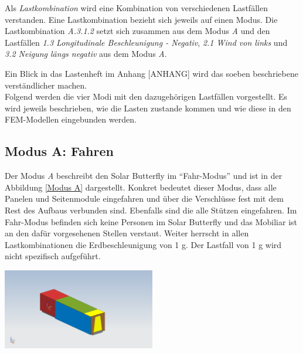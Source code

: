 Als \emph{Lastkombination} wird eine Kombination von verschiedenen Lastfällen verstanden. Eine Lastkombination bezieht sich jeweils auf einen Modus. Die Lastkombination \emph{A.3.1.2} setzt sich zusammen aus dem Modus \emph{A} und den Lastfällen \emph{1.3 Longitudinale Beschleunigung - Negativ}, \emph{2.1 Wind von links} und \emph{3.2 Neigung längs negativ} aus dem Modus \emph{A}.

Ein Blick in das Lastenheft im Anhang [ANHANG] wird das soeben beschriebene verständlicher machen.\\

Folgend werden die vier Modi mit den dazugehörigen Lastfällen vorgestellt. Es wird jeweils beschrieben, wie die Lasten zustande kommen und wie diese in den FEM-Modellen eingebunden werden.

\subsection{Modus A: Fahren}
Der Modus \emph{A} beschreibt den Solar Butterfly im ``Fahr-Modus'' und ist in der Abbildung \ref{Modus A} dargestellt. Konkret bedeutet dieser Modus, dass alle Panelen und Seitenmodule eingefahren und über die Verschlüsse fest mit dem Rest des Aufbaus verbunden sind. Ebenfalls sind die alle Stützen eingefahren. Im Fahr-Modus befinden sich keine Personen im Solar Butterfly und das Mobiliar ist an den dafür vorgesehenen Stellen verstaut. Weiter herrscht in allen Lastkombinationen die Erdbeschleunigung von 1 g. Der Lastfall von 1 g wird nicht spezifisch aufgeführt.

\begin{center}
  \includegraphics[width=0.5\textwidth]{04_Figures/A.png}
  \label{Modus A}
\end{center}

